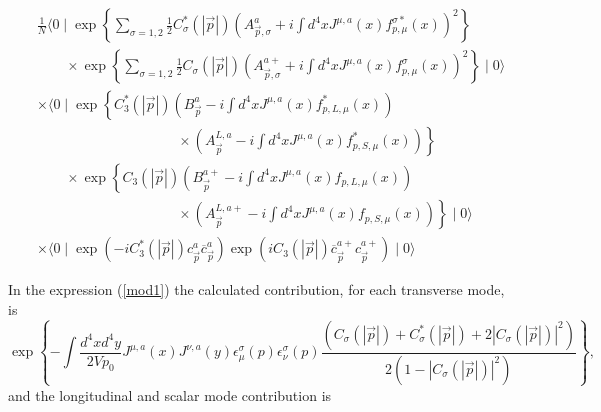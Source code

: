 \documentclass[12pt,letterpaper]{report}
\begin{document}
\begin{eqnarray}
&&\frac 1N\langle 0\mid \exp \left\{ \sum\limits_{\sigma
=1,2}\frac 12C_\sigma ^{*}\left(\left| \vec{p}\right| \right)
\left(A_{\vec{p},\sigma }^a+i\int d^4xJ^{\mu,a}\left(x\right)
f_{p,\mu }^{\sigma *}\left(x\right) \right) ^2\right\} \nonumber
\\ &&\qquad \times \exp \left\{ \sum\limits_{\sigma =1,2}\frac
12C_\sigma \left(\left| \vec{p}\right| \right) \left(
A_{\vec{p},\sigma }^{a+}+i\int d^4xJ^{\mu,a}\left(x\right)
f_{p,\mu }^\sigma \left(x\right) \right) ^2\right\} \mid 0\rangle
\nonumber \\ &&\times\langle 0\mid \exp \left\{ C_3^{*}\left(
\left| \vec{p}\right| \right) \left(B_{\vec{p}}^a-i\int d^4xJ^{\mu
,a}\left(x\right) f_{p,L,\mu }^{*}\left(x\right) \right) \right.
\nonumber \\ &&\qquad\qquad\qquad\qquad\qquad \times \left. \left(
A_{\vec{p}}^{L,a}-i\int d^4xJ^{\mu,a}\left(x\right) f_{p,S,\mu
}^{*}\left(x\right) \right) \right\} \nonumber \\ &&\qquad \times
\exp \left\{ C_3\left(\left| \vec{p}\right| \right) \left(B_{
\vec{p}}^{a+}-i\int d^4xJ^{\mu,a}\left(x\right) f_{p,L,\mu
}\left(x\right) \right) \right. \nonumber \\
&&\qquad\qquad\qquad\qquad\qquad \times \left. \left(
A_{\vec{p}}^{L,a+}-i\int d^4xJ^{\mu,a}\left(x\right) f_{p,S,\mu
}\left(x\right) \right) \right\} \mid 0\rangle \nonumber \\
&&\times\langle 0\mid \exp \left(-iC_3^{*}\left(\left|
\vec{p}\right| \right)
c_{\vec{p}}^a\overline{c}_{\vec{p}}^a\right) \exp \left(
iC_3\left(\left| \vec{p}\right| \right)
\overline{c}_{\vec{p}}^{a+}c_{\vec{p}}^{a+}\right) \mid 0\rangle
\label{mod1}
\end{eqnarray}

In the expression (\ref{mod1}) the calculated contribution, for
each transverse mode, is
\begin{equation}
\exp \left\{ -\int \frac{d^4xd^4y}{2Vp_0}J^{\mu,a}\left(x\right)
J^{\nu,a}\left(y\right) \epsilon _\mu ^\sigma \left(p\right)
\epsilon _\nu ^\sigma \left(p\right) \frac{\left(C_\sigma \left(
\left| \vec{p}\right| \right) +C_\sigma ^{*}\left(\left|
\vec{p}\right| \right) +2\left| C_\sigma \left(\left|
\vec{p}\right| \right) \right| ^2\right) }{2\left(1-\left|
C_\sigma \left(\left| \vec{p}\right| \right) \right| ^2\right)
}\right\}, \label{T1}
\end{equation}
and the longitudinal and scalar mode contribution is
\end{document}
